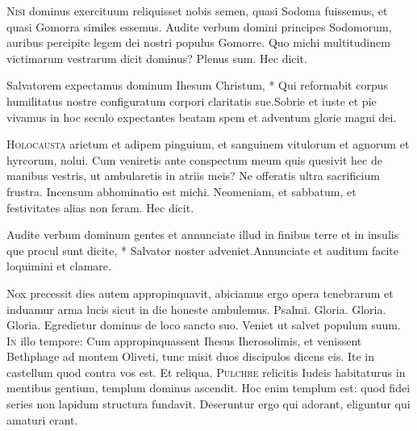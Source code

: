 \begin{multicols*}{2}
\begin{responsory}
\end{responsory}
\lettrine[lines=2]{\zallmancaps \color{Blue} N}{isi} dominus exercituum reliquisset nobis semen, quasi Sodoma fuissemus, et quasi Gomorra similes essemus. Audite verbum domini principes Sodomorum, auribus percipite legem dei nostri populus Gomorre. Quo michi multitudinem victimarum vestrarum dicit dominus? Plenus sum. Hec dicit.
\begin{responsory}
{Salvatorem expectamus dominum Ihesum Christum, * Qui reformabit corpus humilitatus nostre configuratum corpori claritatis sue.}{Sobrie et iuste et pie vivamus in hoc seculo expectantes beatam spem et adventum glorie magni dei.}
\end{responsory}
\lettrine[lines=2]{\zallmancaps \color{Red} H}{olocausta} arietum et adipem pinguium, et sanguinem vitulorum et agnorum et hyrcorum, nolui. Cum veniretis ante conspectum meum quis quesivit hec de manibus vestris, ut ambularetis in atriis meis? Ne offeratis ultra sacrificium frustra. Incensum abhominatio est michi. Neomeniam, et sabbatum, et festivitates alias non feram. Hec dicit.
\begin{responsory-doxology}
{Audite verbum dominum gentes et annunciate illud in finibus terre et in insulis que procul sunt dicite, * Salvator noster adveniet.}{Annunciate et auditum facite loquimini et clamare.}
\end{responsory-doxology}
 Nox precessit dies autem appropinquavit, abiciamus ergo opera tenebrarum et induamur arma lucis sicut in die honeste ambulemus. {\color{Red} Psalmi.}
 Gloria.
 Gloria.
 Gloria. \V Egredietur dominus de loco sancto suo. \R Veniet ut salvet populum suum.
\lettrine[lines=2]{\zallmancaps \color{Blue} I}{n} illo tempore: Cum appropinquassent Ihesus Iherosolimis, et venissent Bethphage ad montem Oliveti, tunc misit duos discipulos dicens eis. Ite in castellum quod contra vos est. Et reliqua.
\lettrine[lines=2]{\zallmancaps \color{Red} P}{ulchre} relicitis Iudeis habitaturus in mentibus gentium, templum dominus ascendit. Hoc enim templum est: quod fidei series non lapidum structura fundavit. Deseruntur ergo qui adorant, eliguntur qui amaturi erant.

\end{multicols*}
